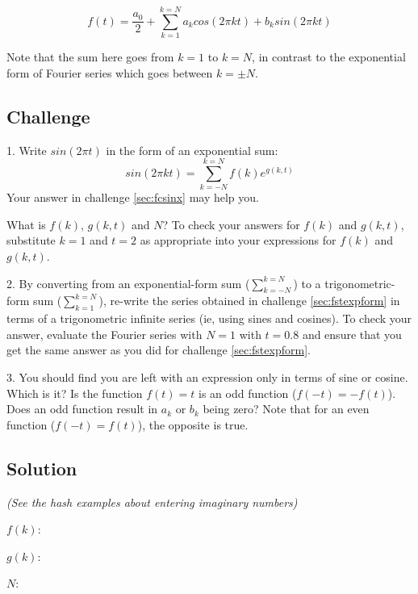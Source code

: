 \begin{equation}
    \label{eq:fsoftintrigform}
    f(t) = \frac{a_0}{2} + \sum_{k=1}^{k=N} a_k cos(2 \pi k t) + b_k sin(2 \pi k t)
\end{equation}

Note that the sum here goes from $k=1$ to $k=N$, in contrast to the exponential form of Fourier series which goes between $k=\pm N$.

\subsection*{Challenge}
1. Write $sin(2 \pi t)$ in the form of an exponential sum:
\begin{equation}
    sin(2 \pi k t)=\sum_{k=-N}^{k=N} f(k) e^{g(k,t)}
\end{equation}
Your answer in challenge \ref{sec:fcsinx} may help you.

What is $f(k)$, $g(k,t)$ and $N$? To check your answers for $f(k)$ and $g(k,t)$, substitute $k=1$ and $t=2$ as appropriate into your expressions for $f(k)$ and $g(k,t)$.

2. By converting from an exponential-form sum ($\sum_{k=-N}^{k=N}$) to a trigonometric-form sum ($\sum_{k=1}^{k=N}$), re-write the series obtained in challenge \ref{sec:fstexpform} in terms of a trigonometric infinite series (ie, using sines and cosines). To check your answer, evaluate the Fourier series with $N=1$ with $t=0.8$ and ensure that you get the same answer as you did for challenge \ref{sec:fstexpform}.

3. You should find you are left with an expression only in terms of sine or cosine. Which is it? Is the function $f(t)=t$ is an odd function ($f(-t)=-f(t)$). Does an odd function result in $a_k$ or $b_k$ being zero? Note that for an even function ($f(-t)=f(t)$), the opposite is true.

\subsection*{Solution}
\emph{(See the hash examples about entering imaginary numbers)}

$f(k)$: 

$g(k)$: 

$N$: 

